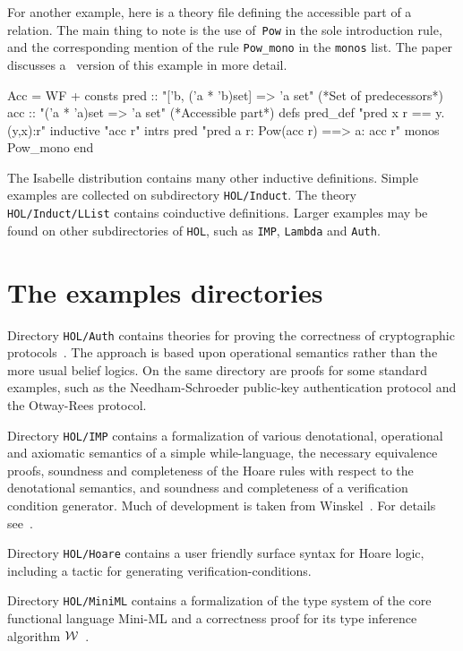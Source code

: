 For another example, here is a theory file defining the accessible
part of a relation.  The main thing to note is the use of~\texttt{Pow} in
the sole introduction rule, and the corresponding mention of the rule
\verb|Pow_mono| in the \texttt{monos} list.  The paper
\cite{paulson-CADE} discusses a \ZF\ version of this example in more
detail.
\begin{ttbox}
Acc = WF + 
consts pred :: "['b, ('a * 'b)set] => 'a set"   (*Set of predecessors*)
       acc  :: "('a * 'a)set => 'a set"         (*Accessible part*)
defs   pred_def  "pred x r == {y. (y,x):r}"
inductive "acc r"
  intrs
     pred "pred a r: Pow(acc r) ==> a: acc r"
  monos   Pow_mono
end
\end{ttbox}
The Isabelle distribution contains many other inductive definitions.  Simple
examples are collected on subdirectory \texttt{HOL/Induct}.  The theory
\texttt{HOL/Induct/LList} contains coinductive definitions.  Larger examples
may be found on other subdirectories of \texttt{HOL}, such as \texttt{IMP},
\texttt{Lambda} and \texttt{Auth}.

 


\section{The examples directories}

Directory \texttt{HOL/Auth} contains theories for proving the correctness of
cryptographic protocols~\cite{paulson-jcs}.  The approach is based upon
operational semantics rather than the more usual belief logics.  On the same
directory are proofs for some standard examples, such as the Needham-Schroeder
public-key authentication protocol and the Otway-Rees
protocol.

Directory \texttt{HOL/IMP} contains a formalization of various denotational,
operational and axiomatic semantics of a simple while-language, the necessary
equivalence proofs, soundness and completeness of the Hoare rules with
respect to the denotational semantics, and soundness and completeness of a
verification condition generator.  Much of development is taken from
Winskel~\cite{winskel93}.  For details see~\cite{nipkow-IMP}.

Directory \texttt{HOL/Hoare} contains a user friendly surface syntax for Hoare
logic, including a tactic for generating verification-conditions.

Directory \texttt{HOL/MiniML} contains a formalization of the type system of
the core functional language Mini-ML and a correctness proof for its type
inference algorithm $\cal W$~\cite{milner78,nipkow-W}.

